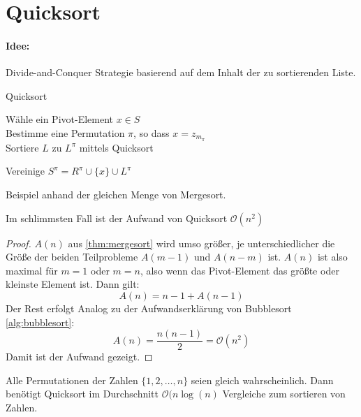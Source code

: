 \section{Quicksort}
\paragraph{Idee:} Divide-and-Conquer Strategie basierend auf dem Inhalt der zu sortierenden Liste.
\begin{algorithm}
\label{alg:quicksort}
\caption{Quicksort}
	Wähle ein Pivot-Element $x \in S$ \\
	Bestimme eine Permutation $\pi$, so dass $x=z_{m_{\pi}}$\\
	{
	Sortiere $L$ zu $L^{\pi}$ mittels Quicksort
	}

	Vereinige $S^{\pi}= R^{\pi} \cup \{x\} \cup L^{\pi}$
\end{algorithm}
\begin{example}
Beispiel anhand der gleichen Menge von Mergesort.
\end{example}
\begin{lemma}
Im schlimmsten Fall ist der Aufwand von Quicksort $\mathcal{O}(n^2)$
\end{lemma}
\begin{proof}
$A(n)$ aus \ref{thm:mergesort} wird umso größer, je unterschiedlicher die Größe der beiden Teilprobleme $A(m-1)$ und $A(n-m)$ ist.
$A(n)$ ist also maximal für $m=1$ oder $m=n$, also wenn das Pivot-Element das größte oder kleinste Element ist. Dann gilt:
\[
A(n)=n-1+A(n-1)
\]
Der Rest erfolgt Analog zu der Aufwandserklärung von Bubblesort \ref{alg:bubblesort}:
\[
A(n)=\frac{n(n-1)}{2}= \mathcal{O}(n^2)
\]
Damit ist der Aufwand gezeigt.
\end{proof}
\begin{theorem}
	Alle Permutationen der Zahlen $\{1,2,\ldots,n\}$ seien gleich wahrscheinlich. Dann benötigt Quicksort im Durchschnitt $\mathcal{O}(n\log(n)$ Vergleiche zum sortieren von Zahlen.
\end{theorem}
